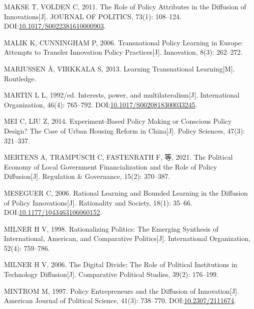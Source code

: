 \documentclass[
  12pt,
]{ctexart}
\newlength{\cslhangindent}
\newlength{\cslentryspacingunit} %
\newenvironment{CSLReferences}[2] %
 {%
  \setlength{\parindent}{0pt}
  \ifodd #1
  \let\oldpar\par
  \def\par{\hangindent=\cslhangindent\oldpar}
  \fi
  \setlength{\parskip}{#2\cslentryspacingunit}
 }%
 {}
\begin{document}
\begin{CSLReferences}{1}{0}
\leavevmode{}%
MAKSE T, VOLDEN C, 2011. The {Role} of {Policy Attributes} in the {Diffusion} of {Innovations}{[}J{]}. JOURNAL OF POLITICS, 73(1): 108--124. DOI:\href{https://doi.org/10.1017/S0022381610000903}{10.1017/S0022381610000903}.

\leavevmode{}%
MALIK K, CUNNINGHAM P, 2006. Transnational Policy Learning in {Europe}: {Attempts} to Transfer Innovation Policy Practices{[}J{]}. Innovation, 8(3): 262--272.

\leavevmode{}%
MARIUSSEN Å, VIRKKALA S, 2013. Learning Transnational Learning{[}M{]}. {Routledge}.

\leavevmode{}%
MARTIN L L, 1992/ed. {Interests, power, and multilateralism}{[}J{]}. International Organization, 46(4): 765--792. DOI:\href{https://doi.org/10.1017/S0020818300033245}{10.1017/S0020818300033245}.

\leavevmode{}%
MEI C, LIU Z, 2014. Experiment-Based Policy Making or Conscious Policy Design? {The} Case of Urban Housing Reform in {China}{[}J{]}. Policy Sciences, 47(3): 321--337.

\leavevmode{}%
MERTENS A, TRAMPUSCH C, FASTENRATH F, 等, 2021. The Political Economy of Local Government Financialization and the Role of Policy Diffusion{[}J{]}. Regulation \& Governance, 15(2): 370--387.

\leavevmode{}%
MESEGUER C, 2006. Rational {Learning} and {Bounded Learning} in the {Diffusion} of {Policy Innovations}{[}J{]}. Rationality and Society, 18(1): 35--66. DOI:\href{https://doi.org/10.1177/1043463106060152}{10.1177/1043463106060152}.

\leavevmode{}%
MILNER H V, 1998. Rationalizing Politics: {The} Emerging Synthesis of International, {American}, and Comparative Politics{[}J{]}. International Organization, 52(4): 759--786.

\leavevmode{}%
MILNER H V, 2006. The Digital Divide: {The} Role of Political Institutions in Technology Diffusion{[}J{]}. Comparative Political Studies, 39(2): 176--199.

\leavevmode{}%
MINTROM M, 1997. Policy {Entrepreneurs} and the {Diffusion} of {Innovation}{[}J{]}. American Journal of Political Science, 41(3): 738--770. DOI:\href{https://doi.org/10.2307/2111674}{10.2307/2111674}.


\end{CSLReferences}
\end{document}
